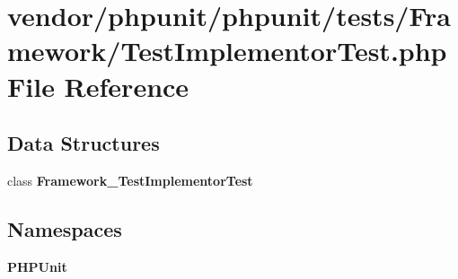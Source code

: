 \section{vendor/phpunit/phpunit/tests/\+Framework/\+Test\+Implementor\+Test.php File Reference}
\label{_test_implementor_test_8php}
\subsection*{Data Structures}
\begin{DoxyCompactItemize}
\item 
class {\bf Framework\+\_\+\+Test\+Implementor\+Test}
\end{DoxyCompactItemize}
\subsection*{Namespaces}
\begin{DoxyCompactItemize}
\item 
 {\bf P\+H\+P\+Unit}
\end{DoxyCompactItemize}
